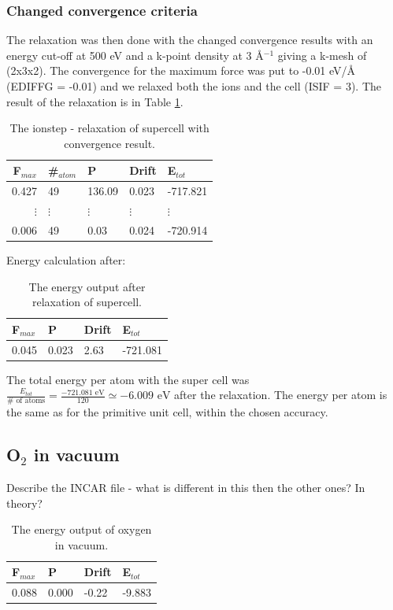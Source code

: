 \subsubsection{Changed convergence criteria}

The relaxation was then done with the changed convergence results with an energy cut-off at 500 eV and a k-point density at 3 Å$^{-1}$ giving a k-mesh of (2x3x2). The convergence for the maximum force was put to -0.01 eV/Å (EDIFFG = -0.01) and we relaxed both the ions and the cell (ISIF = 3). The result of the relaxation is in Table \ref{tab:ionstep_convergence_new}.

\begin{table}[H]\caption{The ionstep - relaxation of supercell with convergence result.}\label{tab:ionstep_convergence_new}
\begin{tabular}{rllll}
F$_{max}$ &\#$_{atom}$&	P&	Drift&	E$_{tot}$\\ \hline
0.427&	49&	136.09&	0.023&	-717.821\\
$\vdots$&$\vdots$&$\vdots$&$\vdots$&$\vdots$\\
0.006&	49&	0.03&	0.024&	-720.914\\
\end{tabular}
\end{table}

Energy calculation after:
\begin{table}[H]\caption{The energy output after relaxation of supercell.}\label{tab:energy_supercell_after_relax}
\begin{tabular}{llll}
F$_{max}$ & P&	Drift&	E$_{tot}$\\ \hline
0.045&	0.023&	2.63	&-721.081\\
\end{tabular}
\end{table}

The total energy per atom with the super cell was $\frac{E_{tot}}{\# \text{ of atoms}} = \frac{-721.081 \text{ eV}}{120} \simeq -6.009 \text{ eV}$ after the relaxation. The energy per atom is the same as for the primitive unit cell, within the chosen accuracy. 

\subsection{O$_2$ in vacuum}

Describe the INCAR file - what is different in this then the other ones? In theory?

\begin{table}[H]\caption{The energy output of oxygen in vacuum.}\label{tab:oxygen_vacuum}
\begin{tabular}{llll}
F$_{max}$ &	P&	Drift&	E$_{tot}$ \\ \hline
0.088&	0.000&	-0.22&	-9.883\\
\end{tabular}
\end{table}

